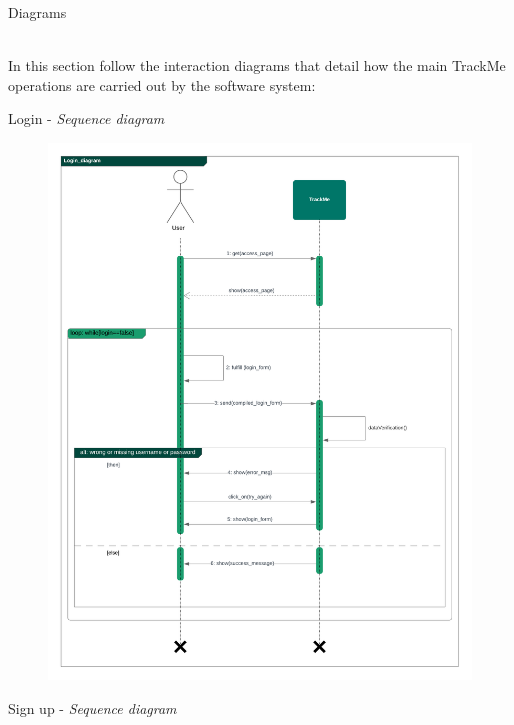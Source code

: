 \documentclass{article}
\begin{document}
\begin{legal}
\begin{legal}
\begin{legal}
\begin{tabular}{| m{3.5cm} | m{8cm}| }
				\hline
				\end{tabular}
				\\\\\\
			\item Diagrams\\\\
			{\normalfont
			In this section follow the interaction diagrams that detail how the main TrackMe operations are carried out by the software system:\\
			
			\begin{legal}
			
			\item Login - \textit{ Sequence diagram}
				\begin{figure}[H]
  				\includegraphics[width=\linewidth]{./images/seq-diagrams/Login_diagram.png}
				\end{figure}
			\item Sign up - \textit{ Sequence diagram}
				\begin{figure}[H]

\end{figure}
\end{legal}}
\end{legal}
\end{legal}
\end{legal}
\end{document}
